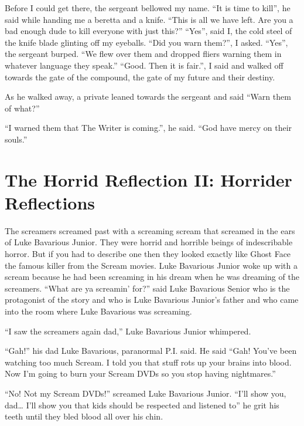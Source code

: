 Before I could get there, the sergeant bellowed my name. ``It is
time to kill'', he said while handing me a beretta and a knife.
``This is all we have left. Are you a bad enough dude to kill
everyone with just this?'' ``Yes'', said I, the cold steel of the
knife blade glinting off my eyeballs. ``Did you warn them?'', I
asked. ``Yes'', the sergeant burped. ``We flew over them and dropped
fliers warning them in whatever language they speak.'' ``Good. Then
it is fair.'', I said and walked off towards the gate of the
compound, the gate of my future and their destiny.



As he walked away, a private leaned towards the sergeant and said
``Warn them of what?''



``I warned them that The Writer is coming.'', he said. ``God have
mercy on their souls.'' 
 



\chapter[Horrider Reflections]{The Horrid Reflection II: Horrider Reflections}



The screamers screamed past with a screaming scream that screamed
in the ears of Luke Bavarious Junior. They were horrid and horrible
beings of indescribable horror. But if you had to describe one then
they looked exactly like Ghost Face the famous killer from the
Scream movies. Luke Bavarious Junior woke up with a scream because
he had been screaming in his dream when he was dreaming of the
screamers. ``What are ya screamin' for?'' said Luke
Bavarious Senior who is the protagonist of the story and who is
Luke Bavarious Junior's father and who came into the room
where Luke Bavarious was screaming.

``I saw the screamers again dad,'' Luke Bavarious Junior
whimpered.

``Gah!'' his dad Luke Bavarious, paranormal P.I. said. He
said ``Gah! You've been watching too much Scream. I told
you that stuff rots up your brains into blood. Now I'm going
to burn your Scream DVDs so you stop having
nightmares.''

``No! Not my Scream DVDs!'' screamed Luke Bavarious
Junior. ``I'll show you, dad{\ldots} I'll show you
that kids should be respected and listened to'' he grit his
teeth until they bled blood all over his chin.




